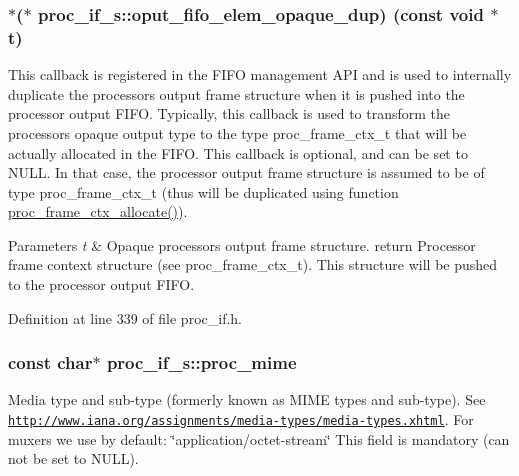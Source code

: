 \subsubsection[{\texorpdfstring{oput\+\_\+fifo\+\_\+elem\+\_\+opaque\+\_\+dup}{oput_fifo_elem_opaque_dup}}]{$\ast$($\ast$ proc\+\_\+if\+\_\+s\+::oput\+\_\+fifo\+\_\+elem\+\_\+opaque\+\_\+dup) (const void $\ast$t)}\hypertarget{structproc__if__s_a7806bbda25988d9ee54f6d0bb143c697}{}\label{structproc__if__s_a7806bbda25988d9ee54f6d0bb143c697}
This callback is registered in the F\+I\+FO management A\+PI and is used to internally duplicate the processor\textquotesingle{}s output frame structure when it is pushed into the processor output F\+I\+FO. Typically, this callback is used to transform the processor\textquotesingle{}s opaque output type to the type proc\+\_\+frame\+\_\+ctx\+\_\+t that will be actually allocated in the F\+I\+FO. This callback is optional, and can be set to N\+U\+LL. In that case, the processor output frame structure is assumed to be of type proc\+\_\+frame\+\_\+ctx\+\_\+t (thus will be duplicated using function \textquotesingle{}\hyperlink{proc__if_8c_a26df07b260850afd03ec73572608a034}{proc\+\_\+frame\+\_\+ctx\+\_\+allocate()}\textquotesingle{}). 
\begin{DoxyParams}{Parameters}
{\em t} & Opaque processor\textquotesingle{}s output frame structure. return Processor frame context structure (see proc\+\_\+frame\+\_\+ctx\+\_\+t). This structure will be pushed to the processor output F\+I\+FO. \\
\hline
\end{DoxyParams}


Definition at line 339 of file proc\+\_\+if.\+h.

\subsubsection[{\texorpdfstring{proc\+\_\+mime}{proc_mime}}]{\setlength{\rightskip}{0pt plus 5cm}const char$\ast$ proc\+\_\+if\+\_\+s\+::proc\+\_\+mime}\hypertarget{structproc__if__s_afdb204f8c976ed829466774aaa6cdf89}{}\label{structproc__if__s_afdb204f8c976ed829466774aaa6cdf89}
Media type and sub-\/type (formerly known as M\+I\+ME types and sub-\/type). See \href{http://www.iana.org/assignments/media-types/media-types.xhtml}{\tt http\+://www.\+iana.\+org/assignments/media-\/types/media-\/types.\+xhtml}. For muxers we use by default\+: \char`\"{}application/octet-\/stream\char`\"{} This field is mandatory (can not be set to N\+U\+LL). 

